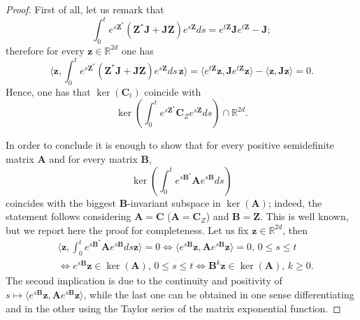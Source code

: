 \documentclass[10pt,a4paper]{amsart}
\def\RR{\mathbb{R}}
\begin{document}
\begin{proof}
First of all, let us remark that
$$\int_0^t e^{s\mathbf{Z}^*}(\mathbf{Z}^*\mathbf{J} + \mathbf{J}\mathbf{Z})e^{s \mathbf{Z}}ds=e^{t\mathbf{Z}} \mathbf{J} e^{t\mathbf{Z}}-\mathbf{J};$$
therefore for every $\mathbf{z}
\in \RR^{2d}$ one has
$$\langle \mathbf{z}, \int_0^t e^{s\mathbf{Z}^*}(\mathbf{Z}^*\mathbf{J} + \mathbf{J}\mathbf{Z})e^{s \mathbf{Z}}ds \,\mathbf{z} \rangle=\langle e^{t \mathbf{Z}}\mathbf{z}, \mathbf{J} e^{t\mathbf{Z}}\mathbf{z} \rangle -\langle \mathbf{z}, \mathbf{J} \mathbf{z} \rangle=0.$$
Hence, one has that $\ker(\mathbf{C}_t)$ coincide with
$$\ker \left ( \int_0^t e^{s\mathbf{Z}^*}\mathbf{C}_{Z}e^{s \mathbf{Z}}ds\right )\cap \RR^{2d}.$$

In order to conclude it is enough to show that for every positive semidefinite matrix $\mathbf{A}$ and for every matrix $\mathbf{B}$,
$$\ker\left ( \int_0^t e^{s\mathbf{B}^*} \mathbf{A} e^{s \mathbf{B}}ds \right )$$
coincides with the biggest $\mathbf{B}$-invariant subspace in $\ker(\mathbf{A})$; indeed, the statement follows considering $\mathbf{A}=\mathbf{C}$ ($\mathbf{A}=\mathbf{C}_Z$) and $\mathbf{B}=\mathbf{Z}$. This is well known, but we report here the proof for completeness. Let us fix $\mathbf{z} \in \RR^{2d}$, then
\begin{align*}&\langle \mathbf{z},\int_0^t e^{s\mathbf{B}^*} \mathbf{A} e^{s \mathbf{B}}ds \mathbf{z} \rangle=0 \Leftrightarrow  \langle e^{s \mathbf{B}} \mathbf{z},  \mathbf{A} e^{s \mathbf{B}}\mathbf{z} \rangle=0, \, 0\leq s \leq t\\
&\Leftrightarrow e^{s\mathbf{B}} \mathbf{z} \in \ker(\mathbf{A}), \, 0 \leq s \leq t \Leftrightarrow \mathbf{B}^k \mathbf{z} \in \ker(\mathbf{A}), \, k \geq 0.\end{align*}
The second implication is due to the continuity and positivity of $s \mapsto \langle e^{s \mathbf{B}} \mathbf{z},  \mathbf{A} e^{s \mathbf{B}}\mathbf{z} \rangle$, while the last one can be obtained in one sense differentiating and in the other using the Taylor series of the matrix exponential function.
\end{proof}
\end{document}

